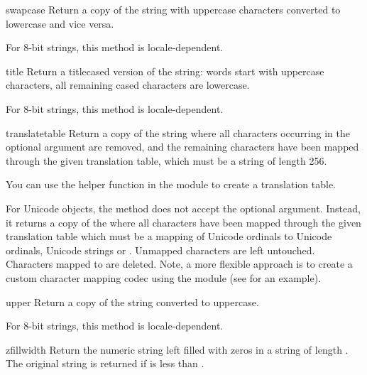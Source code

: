 \begin{methoddesc}[string]{swapcase}{}
Return a copy of the string with uppercase characters converted to
lowercase and vice versa.

For 8-bit strings, this method is locale-dependent.
\end{methoddesc}

\begin{methoddesc}[string]{title}{}
Return a titlecased version of the string: words start with uppercase
characters, all remaining cased characters are lowercase.

For 8-bit strings, this method is locale-dependent.
\end{methoddesc}

\begin{methoddesc}[string]{translate}{table}
Return a copy of the string where all characters occurring in the
optional argument  are removed, and the remaining
characters have been mapped through the given translation table, which
must be a string of length 256.

You can use the  helper function in the
 module to create a translation table.

For Unicode objects, the  method does not
accept the optional  argument.  Instead, it
returns a copy of the  where all characters have been mapped
through the given translation table which must be a mapping of
Unicode ordinals to Unicode ordinals, Unicode strings or .
Unmapped characters are left untouched. Characters mapped to 
are deleted.  Note, a more flexible approach is to create a custom
character mapping codec using the  module (see
 for an example).      
\end{methoddesc}

\begin{methoddesc}[string]{upper}{}
Return a copy of the string converted to uppercase.

For 8-bit strings, this method is locale-dependent.
\end{methoddesc}

\begin{methoddesc}[string]{zfill}{width}
Return the numeric string left filled with zeros in a string
of length . The original string is returned if
 is less than .
\end{methoddesc}


